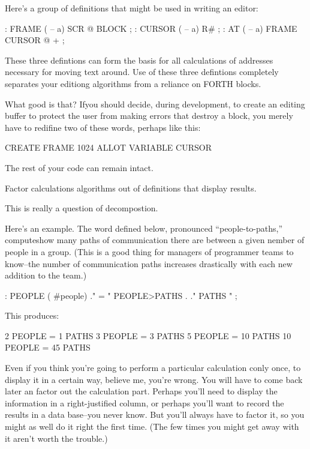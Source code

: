 Here's a group of definitions that might be used in writing an editor:

\begin{Code}
: FRAME  ( -- a)  SCR @ BLOCK ;
: CURSOR  ( -- a)  R# ;
: AT  ( -- a)  FRAME  CURSOR @ + ;
\end{Code}
These three defintions can form the basis for all calculations of addresses necessary for moving text around. Use of these three defintions completely separates your editiong algorithms from a reliance on FORTH blocks.

What good is that? Ifyou should decide, during development, to create an editing buffer to protect the user from making errors that destroy a block, you merely have to redifine two of these words, perhaps like this:

\begin{Code}
CREATE FRAME  1024 ALLOT
VARIABLE CURSOR
\end{Code}
The rest of your code can remain intact. 

\begin{tip}
Factor calculations algorithms out of definitions that display results.
\end{tip}
This is really a question of decompostion.

Here's an example. The word defined below, pronounced ``people-to-paths,'' computeshow many paths of communication there are between a given nember of people in a group. (This is a good thing for managers of programmer teams to know--the number of communication paths increases drastically with each new addition to the team.)

\begin{Code}
: PEOPLE  ( #people)
    ." = "  PEOPLE>PATHS  .  ." PATHS " ;
\end{Code}
This produces:

\begin{Code}
2 PEOPLE = 1 PATHS
3 PEOPLE = 3 PATHS
5 PEOPLE = 10 PATHS
10 PEOPLE = 45 PATHS
\end{Code}
Even if you think you're going to perform a particular calculation conly once, to display it in a certain way, believe me, you're wrong. You will have to come back later an factor out the calculation part. Perhaps you'll need to display the information in a right-justified column, or perhaps you'll want to record the results in a data base--you never know. But you'll always have to factor it, so you might as well do it right the first time. (The few times you might get away with it aren't worth the trouble.)

